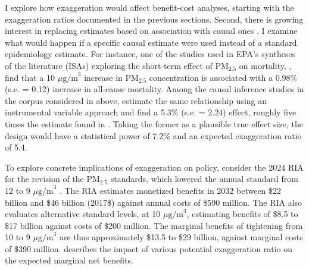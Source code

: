 \documentclass[12pt]{article}
\begin{document}
		I explore how exaggeration would affect benefit-cost analyses, starting with the exaggeration ratios documented in the previous sections. Second, there is growing interest in replacing estimates based on association with causal ones \citep{dominici_best_2017, bind_causal_2019}. I examine what would happen if a specific causal estimate were used instead of a standard epidemiology estimate. For instance, one of the studies used in EPA's syntheses of the literature (ISAs) exploring the short-term effect of PM$_{2.5}$ on mortality, \cite{zanobetti_effect_2009}, find  that a 10 $\mu\text{g/m}^3$ increase in PM$_{2.5}$ concentration is associated with a 0.98\% (s.e. = 0.12) increase in all-cause mortality. Among the causal inference studies in the corpus considered in above, \cite{schwartz_estimating_2015} estimate the same relationship using an instrumental variable approach and find a 5.3\% (s.e. = 2.24) effect, roughly five times the estimate found in \cite{zanobetti_effect_2009}. Taking the former as a plausible true effect size, the \cite{schwartz_estimating_2015} design would have a statistical power of 7.2\% and an expected exaggeration ratio of 5.4. %
		
		To explore concrete implications of exaggeration on policy, consider the 2024 RIA for the revision of the PM$_{2.5}$ standards, which lowered the annual standard from 12 to 9 $\mu\text{g/m}^3$ \citep{u.s.epa_final_2024}. The RIA estimates monetized benefits in 2032 between \$22 billion and \$46 billion (2017\$) against annual costs of \$590 million.  %
		The RIA also evaluates alternative standard levels, at 10 $\mu\text{g/m}^3$, estimating  benefits of \$8.5 to \$17 billion against costs of \$200 million. The marginal benefits of tightening from 10 to 9 $\mu\text{g/m}^3$ are thus approximately \$13.5 to \$29 billion, against marginal costs of \$390 million.  describes the impact of various potential exaggeration ratio on the expected marginal net benefits.
	
		
		
		
\end{document}
